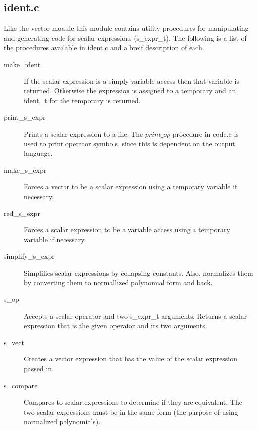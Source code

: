 \subsection{ident.c}
Like the vector module this module contains utility procedures for manipulating
and generating code for scalar expressions (s\_expr\_t).  The following is a
list of the procedures available in ident.c and a breif description of each.
\begin{description}
\item[make\_ident] If the scalar expression is a simply variable access then
that variable is returned.  Otherwise the expression is assigned to a temporary
and an ident\_t for the temporary is returned.
\item[print\_s\_expr] Prints a scalar expression to a file.  The $print\_op$
procedure in code.c is used to print operator symbols, since this is dependent
on the output language.
\item[make\_s\_expr] Forces a vector to be a scalar expression using a 
temporary variable if necessary.
\item[red\_s\_expr] Forces a scalar expression to be a variable access using
a temporary variable if necessary.
\item[simplify\_s\_expr]  Simplifies scalar expressions by collapsing 
constants.  Also, normalizes them by converting them to normallized polynomial
form and back.
\item[s\_op] Accepts a scalar operator and two s\_expr\_t arguments.  Returns
a scalar expression that is the given operator and its two arguments.
\item[s\_vect] Creates a vector expression that has the value of the scalar
expression passed in.
\item[s\_compare] Compares to scalar expressions to determine if they are
equivalent.  The two scalar expressions must be in the same form (the
purpose of using normalized polynomials).
\end{description}


